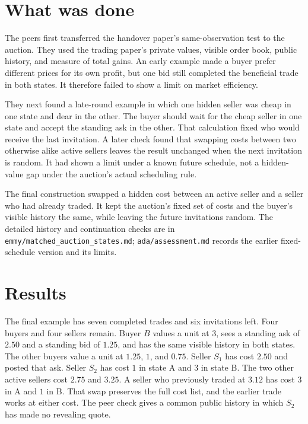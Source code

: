 \documentclass{article}
\begin{document}
\section{What was done}

The peers first transferred the handover paper's same-observation test to the auction. They used the trading paper's
private values, visible order book, public history, and measure of total gains. An early example made a buyer prefer
different prices for its own profit, but one bid still completed the beneficial trade in both states. It therefore
failed to show a limit on market efficiency.

They next found a late-round example in which one hidden seller was cheap in one state and dear in the other. The
buyer should wait for the cheap seller in one state and accept the standing ask in the other. That calculation fixed
who would receive the last invitation. A later check found that swapping costs between two otherwise alike active
sellers leaves the result unchanged when the next invitation is random. It had shown a limit under a known future
schedule, not a hidden-value gap under the auction's actual scheduling rule.

The final construction swapped a hidden cost between an active seller and a seller who had already traded. It kept the
auction's fixed set of costs and the buyer's visible history the same, while leaving the future invitations random.
The detailed history and continuation checks are in \texttt{emmy/matched\_auction\_states.md};
\texttt{ada/assessment.md} records the earlier fixed-schedule version and its limits.

\section{Results}

The final example has seven completed trades and six invitations left. Four buyers and four sellers remain. Buyer
\(B\) values a unit at \(3\), sees a standing ask of \(2.50\) and a standing bid of \(1.25\), and has the same visible
history in both states. The other buyers value a unit at \(1.25\), \(1\), and \(0.75\). Seller \(S_1\) has cost
\(2.50\) and posted that ask. Seller \(S_2\) has cost \(1\) in state A and \(3\) in state B. The two other active
sellers cost \(2.75\) and \(3.25\). A seller who previously traded at \(3.12\) has cost \(3\) in A and \(1\) in B.
That swap preserves the full cost list, and the earlier trade works at either cost. The peer check gives a common
public history in which \(S_2\) has made no revealing quote.
\end{document}
